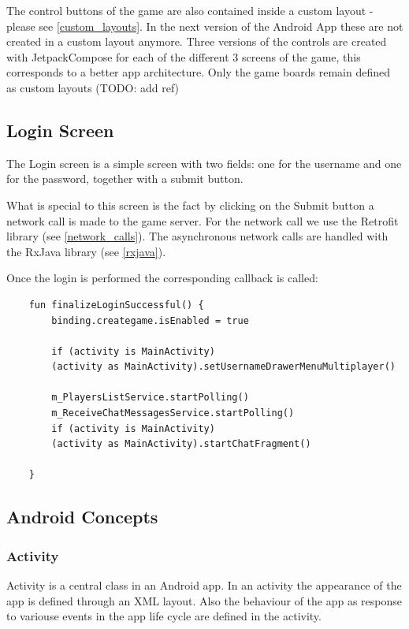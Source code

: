 The control buttons of the game are also contained inside a custom layout - please see \ref{custom_layouts}. In the next version of the Android App these are not created in a custom layout anymore. Three versions of the controls are created with JetpackCompose for each of the different 3 screens of the game, this corresponds to a better app architecture. Only the game boards remain defined as custom layouts (TODO: add ref)

\subsection{Login Screen}

The Login screen is a simple screen with two fields: one for the username and one for the password, together with a submit button.

What is special to this screen is the fact by clicking on the Submit button a network call is made to the game server. For the network call we use the Retrofit library (see \ref{network_calls}). The asynchronous network calls are handled with the RxJava library (see \ref{rxjava}).

Once the login is performed the corresponding callback is called:

\begin{lstlisting}
	fun finalizeLoginSuccessful() {
		binding.creategame.isEnabled = true
		
		if (activity is MainActivity)
		(activity as MainActivity).setUsernameDrawerMenuMultiplayer()
		
		m_PlayersListService.startPolling()
		m_ReceiveChatMessagesService.startPolling()
		if (activity is MainActivity)
		(activity as MainActivity).startChatFragment()
		
	}
\end{lstlisting}

\subsection { Android Concepts }

\subsubsection { Activity }

Activity is a central class in an Android app. In an activity the appearance of the app is defined through an XML layout. Also the behaviour of the app as response to variouse events in the app life cycle are defined in the activity.

